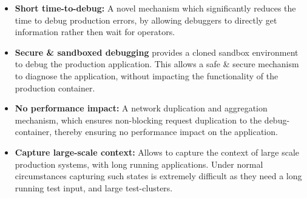 \begin{itemize}[leftmargin=*,topsep=0pt,itemsep=-1ex,partopsep=1ex,parsep=1ex]
\item \textbf{Short time-to-debug:} A novel mechanism which significantly reduces the time to debug production errors, by allowing debuggers to directly get information rather then wait for operators. 
\item \textbf{Secure \& sandboxed debugging} \parikshan provides a cloned sandbox environment to debug the production application.
This allows a safe \& secure mechanism to diagnose the application, without impacting the functionality of the production container.
\item \textbf{No performance impact:} A network duplication and aggregation mechanism, which ensures non-blocking request duplication to the debug-container, thereby ensuring no performance impact on the application. 
\item \textbf{Capture large-scale context:} Allows to capture the context of large scale production systems, with long running applications. Under normal circumstances capturing such states is extremely difficult as they need a long running test input, and large test-clusters.


\end{itemize}


